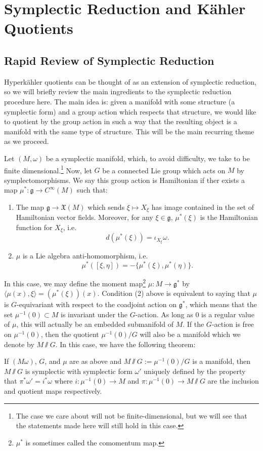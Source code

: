 \section{Symplectic Reduction and K\"ahler Quotients}
\subsection{Rapid Review of Symplectic Reduction}
Hyperk\"ahler quotients can be thought of as an extension of symplectic reduction, so we will briefly review the main ingredients to the symplectic reduction procedure here. The main idea is: given a manifold with some structure (a symplectic form) and a group action which respects that structure, we would like to quotient by the group action in such a way that the resulting object is a manifold with the same type of structure. This will be the main recurring theme as we proceed. 

Let $(M,\omega)$ be a symplectic manifold, which, to avoid difficulty, we take to be finite dimensional.\footnote{The case we care about will not be finite-dimensional, but we will see that the statements made here will still hold in this case.} Now, let $G$ be a connected Lie group which acts on $M$ by symplectomorphisms. We say this group action is Hamiltonian if ther exists a map $\mu^*: \mathfrak{g}\to C^\infty(M)$ such that:
\begin{enumerate}
  \item The map $\mathfrak{g}\to \mathfrak{X}(M)$ which sends $\xi\mapsto X_\xi$ has image contained in the set of Hamiltonian vector fields. Moreover, for any $\xi\in \mathfrak{g}$, $\mu^*(\xi)$ is the Hamiltonian function for $X_\xi$, i.e. 
\begin{equation*}
  d(\mu^*(\xi)) = \iota_{X_\xi}\omega.
\end{equation*}
  \item $\mu$ is a Lie algebra anti-homomorphism, i.e. 
\begin{equation*}
  \mu^*([\xi,\eta]) = - \{\mu^*(\xi),\mu^*(\eta)\}.
\end{equation*}
\end{enumerate}
In this case, we may define the moment map\footnote{$\mu^*$ is sometimes called the comomentum map.} $\mu: M\to\mathfrak{g}^*$ by $\langle \mu(x),\xi\rangle = (\mu^*(\xi))(x)$. Condition (2) above is equivalent to saying that $\mu$ is $G$-equivariant with respect to the coadjoint action on $\mathfrak{g}^*$, which means that the set $\mu^{-1}(0)\subset M$ is invariant under the $G$-action. As long as 0 is a regular value of $\mu$, this will actually be an embedded submanifold of $M$. If the $G$-action is free on $\mu^{-1}(0)$, then the quotient $\mu^{-1}(0)/G$ will also be a manifold which we denote by $M\sslash G$. In this case, we have the following theorem:
\begin{thm}
  If $(M\omega)$, $G$, and $\mu$ are as above and $M\sslash G := \mu^{-1}(0)/G$ is a manifold, then $M\sslash G$ is symplectic with symplectic form $\omega'$ uniquely defined by the property that $\pi^*\omega' = i^*\omega$ where $i:\mu^{-1}(0)\to M$ and $\pi: \mu^{-1}(0)\to M\sslash G$ are the inclusion and quotient maps respectively. 
\end{thm}
